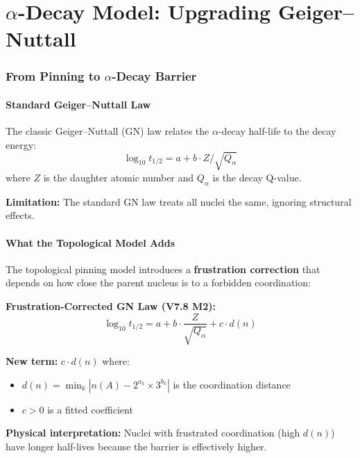 \documentclass[11pt,a4paper]{article}
\begin{document}
\part{$\alpha$-Decay Model: Upgrading Geiger--Nuttall}

\section{From Pinning to $\alpha$-Decay Barrier}
\label{sec:alpha_barrier}

\subsection{Standard Geiger--Nuttall Law}

The classic Geiger--Nuttall (GN) law relates the $\alpha$-decay half-life to the decay energy:
\begin{equation}
    \log_{10} t_{1/2} = a + b \cdot Z / \sqrt{Q_\alpha}
    \label{eq:gn_standard}
\end{equation}
where $Z$ is the daughter atomic number and $Q_\alpha$ is the decay Q-value.

\textbf{Limitation:} The standard GN law treats all nuclei the same, ignoring structural effects.

\subsection{What the Topological Model Adds}

The topological pinning model introduces a \textbf{frustration correction} that depends on how close the parent nucleus is to a forbidden coordination:

\begin{derivbox}
\textbf{Frustration-Corrected GN Law (V7.8 M2):}
\begin{equation}
    \log_{10} t_{1/2} = a + b \cdot \frac{Z}{\sqrt{Q_\alpha}} + c \cdot d(n)
    \label{eq:gn_corrected}
\end{equation}

\textbf{New term:} $c \cdot d(n)$ where:
\begin{itemize}[nosep]
    \item $d(n) = \min_k |n(A) - 2^{a_k} \times 3^{b_k}|$ is the coordination distance
    \item $c > 0$ is a fitted coefficient
\end{itemize}

\textbf{Physical interpretation:} Nuclei with frustrated coordination (high $d(n)$) have longer half-lives because the barrier is effectively higher.
\end{derivbox}
\end{document}

